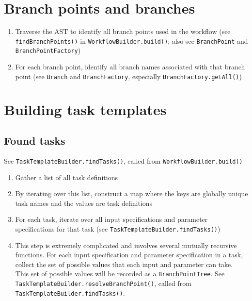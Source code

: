 \documentclass{report}
\begin{document}
\section{Branch points and branches}

\begin{enumerate}

\item Traverse the AST to identify all branch points used in the workflow 
      (see \texttt{findBranchPoints()} in \texttt{WorkflowBuilder.build()}; also 
       see \texttt{BranchPoint} and \texttt{BranchPointFactory})

\item For each branch point, identify all branch names associated with that branch point 
      (see \texttt{Branch} and \texttt{BranchFactory}, especially \texttt{BranchFactory.getAll()})

\end{enumerate}


\section{Building task templates}

\subsection{Found tasks}

See \texttt{TaskTemplateBuilder.findTasks()}, called from \texttt{WorkflowBuilder.build()}

\begin{enumerate}

\item Gather a list of all task definitions

\item By iterating over this list, construct a map where 
      the keys are globally unique task names and 
      the values are task definitions

\item For each task, iterate over all input specifications and parameter specifications for that task
      (see \texttt{TaskTemplateBuilder.findTasks()})

\item This step is extremely complicated and involves several mutually recursive functions.
      For each input specification and parameter specification in a task, 
      collect the set of possible values that each input and parameter can take. 
      This set of possible values will be recorded as a \texttt{BranchPointTree}.
      See \texttt{TaskTemplateBuilder.resolveBranchPoint()}, called from \texttt{TaskTemplateBuilder.findTasks()}.
      

\end{enumerate}
\end{document}
